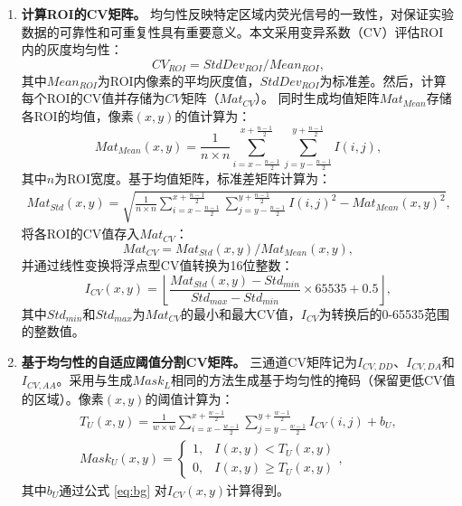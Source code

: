 \begin{enumerate}
\item \textbf{计算ROI的CV矩阵。}  
均匀性反映特定区域内荧光信号的一致性，对保证实验数据的可靠性和可重复性具有重要意义。本文采用变异系数（CV）评估ROI内的灰度均匀性：
\begin{equation}
   {CV}_{ROI}={StdDev}_{ROI} / {Mean}_{ROI},
    \label{eq4}
\end{equation}
其中${Mean}_{ROI}$为ROI内像素的平均灰度值，${StdDev}_{ROI}$为标准差。然后，计算每个ROI的CV值并存储为$CV$矩阵（${Mat}_{CV}$）。  
同时生成均值矩阵${Mat}_{Mean}$存储各ROI的均值，像素$(x,y)$的值计算为：
\begin{equation}    
    {Mat}_{Mean}(x,y)=\frac{1}{n \times n} \sum_{i=x- \frac{n-1}{2}}^{x+\frac{n-1}{2}} \sum_{j=y-\frac{n-1}{2}}^{y+\frac{n-1}{2}} I(i,j),
    \label{eq5}
\end{equation}
其中$n$为ROI宽度。基于均值矩阵，标准差矩阵计算为：
\begin{equation}
    \begin{split}
    {Mat}_{Std}(x,y)=
    \sqrt{\frac{1}{n \times n} \sum_{i=x-\frac{n-1}{2}}^{x+\frac{n-1}{2}} \sum_{j=y-\frac{n-1}{2}}^{y+\frac{n-1}{2}}{I(i,j)}^2-{{Mat}_{Mean}(x,y)}^2},
    \end{split}
    \label{eq6}
\end{equation}
将各ROI的CV值存入${Mat}_{CV}$：
\begin{equation}
    {Mat}_{CV}={Mat}_{Std}(x,y)/{Mat}_{Mean}(x,y),
    \label{eq7}
\end{equation}
并通过线性变换将浮点型CV值转换为16位整数：
\begin{equation}
    {I}_{CV}(x,y)=\left\lfloor\frac{{Mat}_{Std}(x,y)-{Std}_{min}} {{Std}_{max}-{Std}_{min}}\times65535 + 0.5\right\rfloor,
\end{equation}
其中${Std}_{min}$和${Std}_{max}$为${Mat}_{CV}$的最小和最大CV值，$I_{CV}$为转换后的0-65535范围的整数值。

\item \textbf{基于均匀性的自适应阈值分割CV矩阵。}  
三通道CV矩阵记为$I_{CV, DD}$、$I_{CV, DA}$和$I_{CV,AA}$。采用与生成${Mask}_{L}$相同的方法生成基于均匀性的掩码（保留更低CV值的区域）。像素$(x,y)$的阈值计算为：
\begin{align}
    T_U(x, y)=\frac{1}{w \times w} \sum_{i=x-\frac{w-1}{2}}^{x+\frac{w-1}{2}} \sum_{j=y-\frac{w-1}{2}}^{y+\frac{w-1}{2}} {I}_{CV}(i, j)+b_U,
    \label{eq8} \\
    {Mask}_U(x,y)=\begin{cases}1,&I(x,y) < T_U(x, y)\\ 0,&I(x, y) \ge T_U(x, y)\end{cases},
    \label{eq9}
\end{align}
其中$b_U$通过公式 \ref{eq:bg} 对$I_{CV}(x,y)$计算得到。


\end{enumerate}

